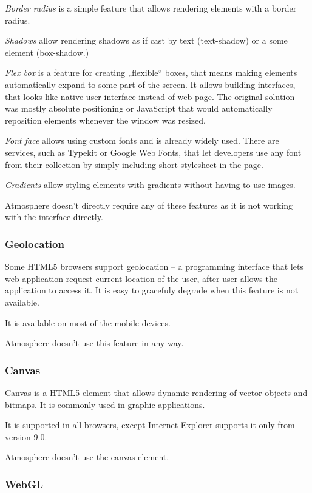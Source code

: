 \emph{Border radius} is a simple feature that allows rendering elements with a border radius. 

\emph{Shadows} allow rendering shadows as if cast by text (text-shadow) or a some element (box-shadow.) 

\emph{Flex box} is a feature for creating „flexible“ boxes, that means making elements automatically expand to some part of the screen. It allows building interfaces, that looks like native user interface instead of web page. The original solution was mostly absolute positioning or JavaScript that would automatically reposition elements whenever the window was resized. 

\emph{Font face} allows using custom fonts and is already widely used. There are services, such as Typekit or Google Web Fonts, that let developers use any font from their collection by simply including short stylesheet in the page. 

\emph{Gradients} allow styling elements with gradients without having to use images.

Atmosphere doesn’t directly require any of these features as it is not working with the interface directly.  

\subsubsection{Geolocation}

Some HTML5 browsers support geolocation – a programming interface that lets web application request current location of the user, after user allows the application to access it. It is easy to gracefuly degrade when this feature is not available.

It is available on most of the mobile devices. 

Atmosphere doesn’t use this feature in any way.

\subsubsection{Canvas}

Canvas is a HTML5 element that allows dynamic rendering of vector objects and bitmaps. It is commonly used in graphic applications.

It is supported in all browsers, except Internet Explorer supports it only from version 9.0.

Atmosphere doesn’t use the canvas element.

\subsubsection{WebGL}

